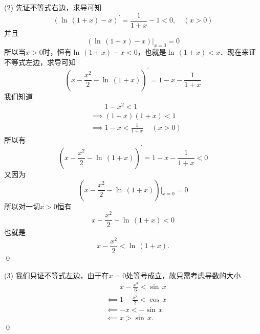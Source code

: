 (2) \prove 先证不等式右边，求导可知
\begin{equation}
    \left(\ln \, \left(1+x\right) - x\right)^\prime = \frac{1}{1+x} - 1 < 0 , \quad ( x > 0)
\end{equation}
并且
\begin{equation}
    \left(\ln \, \left(1+x\right) - x\right) \bigg\vert_{x = 0} = 0
\end{equation}
所以当$x > 0$时，恒有$\ln \, \left(1+x\right) - x < 0$，也就是$\ln \, \left(1+x\right) < x$．现在来证不等式左边，求导可知
\begin{equation}
    \left(x-\frac{x^2}{2}-\ln \, \left(1+x\right)\right)^\prime = 1 - x - \frac{1}{1+x}
\end{equation}
我们知道
\begin{align}
    &\mathrel{\phantom{\implies}} 1 - x^2 < 1 \\
    &\implies (1-x)(1+x) < 1 \\
    &\implies 1-x < \frac{1}{1+x} \, \quad (x > 0) 
\end{align}
所以有
\begin{equation}
    \left(x - \frac{x^2}{2}-\ln \, \left(1+x\right)\right)^\prime = 1 - x - \frac{1}{1+x} < 0
\end{equation}
又因为
\begin{equation}
    \left(x - \frac{x^2}{2}-\ln \, \left(1+x\right)\right) \bigg\vert_{x = 0} = 0
\end{equation}
所以对一切$x > 0$恒有
\begin{equation}
    x - \frac{x^2}{2} - \ln \, \left(1+x\right) < 0
\end{equation}
也就是
\begin{equation}
    x - \frac{x^2}{2} < \ln \, \left(1+x\right).
\end{equation}
\qed\bigskip

(3) \prove 我们只证不等式左边，由于在$x=0$处等号成立，故只需考虑导数的大小
\begin{align}
    &\mathrel{\phantom{\impliedby}} x - \frac{x^3}{6} < \sin \, x \\
    &\impliedby 1 - \frac{x^2}{2} < \cos \, x \\
    &\impliedby - x < -\sin \, x \\
    &\impliedby x > \sin \, x.
\end{align}
\qed\bigskip

